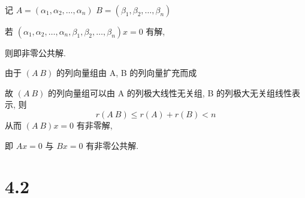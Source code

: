 	 \paragraph{} %
		 记 $A = (\alpha_{1}, \alpha_{2}, \dots, \alpha_{n})$ $B = (\beta_{1}, \beta_{2}, \dots, \beta_{n})$

		 若 $(\alpha_{1}, \alpha_{2}, \dots, \alpha_{n}, \beta_{1}, \beta_{2}, \dots, \beta_{n})x = 0$ 有解,

		 则即非零公共解.

		 由于 $(A\ B)$ 的列向量组由 A, B 的列向量扩充而成

		 故 $(A\ B)$ 的列向量组可以由 A 的列极大线性无关组, B 的列极大无关组线性表示, 则
		 \[ r(A\ B) \leq r(A) + r(B) < n \]
		 从而 $(A\ B)x = 0$ 有非零解,

		 即 $Ax=0$ 与 $Bx=0$ 有非零公共解.


\section{4.2}

 \subsection{} %


